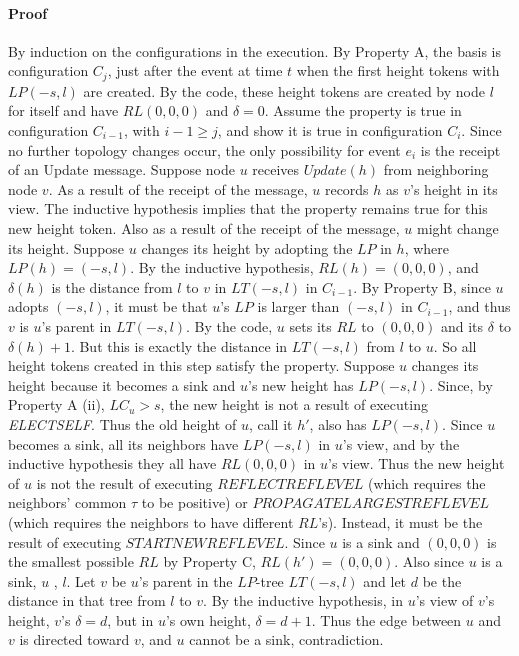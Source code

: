 \documentclass{article}
\begin{document}
\paragraph{Proof}
By induction on the configurations in the execution. By Property A, the basis is configuration $C_j$, just after the event at time $t$ when the first height tokens with $LP(−s, l)$ are created. By the code, these height tokens are created by node $l$ for itself and have $RL(0, 0, 0)$ and $\delta = 0$. Assume the property is true in configuration $C_{i − 1}$, with $i − 1 \geq j$, and show it is true in configuration $C_i$. Since no further topology changes occur, the only possibility for event $e_i$ is the receipt of an Update message. Suppose node $u$ receives $Update(h)$ from neighboring node $v$. As a result of the receipt of the message, $u$ records $h$ as
$v$'s height in its view. The inductive hypothesis implies that the property remains true for this new height token. Also as a result of the receipt of the message, $u$ might change its height. Suppose $u$ changes its height by adopting the $LP$ in $h$, where $LP(h) = (−s, l)$. By the inductive hypothesis, $RL(h) = (0, 0, 0)$, and $\delta (h)$ is the distance from $l$ to $v$ in $LT(−s, l)$ in $C_{i − 1}$. By Property B, since $u$ adopts $(−s, l)$, it must be that $u$'s $LP$ is larger than $(−s, l)$ in $C_{i − 1}$, and thus $v$ is $u$'s parent in $LT (−s, l)$. By the code, $u$ sets its $RL$ to $(0, 0, 0)$ and its $\delta $ to $\delta (h)+ 1$. But this is exactly the distance in $LT(−s, l)$ from $l$ to $u$. So all height tokens created in this step satisfy the property.
Suppose $u$ changes its height because it becomes a sink and $u$'s new height has $LP(−s, l)$. Since, by Property A (ii), $LC_u > s$, the new height is not a result of executing \textit{ELECTSELF}. Thus the old height of $u$, call it $h'$, also has $LP(−s, l)$. Since $u$ becomes a sink, all its neighbors have $LP(−s, l)$ in $u$'s view, and by the inductive hypothesis they all have $RL(0, 0, 0)$ in $u$’s view. Thus the new height of $u$ is not the result of executing $REFLECTREFLEVEL$ (which requires the neighbors’ common $\tau $ to be positive) or $PROPAGATELARGESTREFLEVEL$ (which requires the neighbors to have different $RL$’s). Instead, it must be the result of executing $STARTNEWREFLEVEL$. Since $u$ is a sink and $(0, 0, 0)$ is the smallest possible $RL$ by Property C, $RL(h') = (0, 0, 0)$. Also since $u$ is a sink, $u$ , $l$. Let $v$ be $u$’s parent in the $LP$-tree $LT(−s, l)$ and let $d$ be the distance in that tree from $l$ to $v$. By the inductive hypothesis, in $u$'s view of $v$’s height, $v$'s $\delta = d$, but in $u$'s own height, $\delta = d + 1$. Thus the edge between $u$ and $v$ is directed toward $v$, and $u$ cannot be a sink, contradiction.
\end{document}
